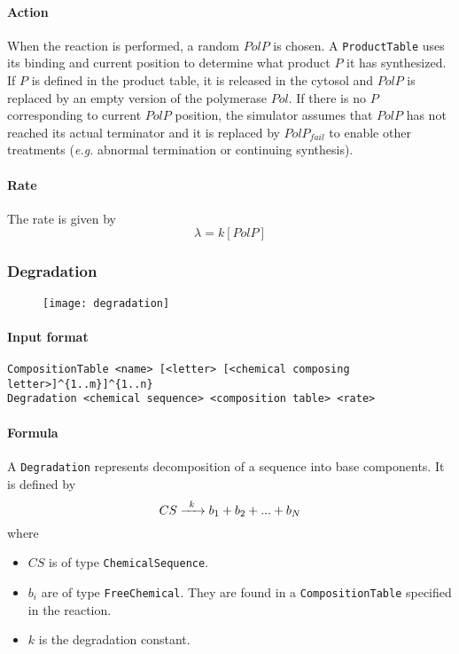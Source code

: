 \paragraph{Action} When the reaction is performed, a random $PolP$ is chosen. A \texttt{ProductTable} uses its binding and current position to determine what product $P$ it has synthesized. If $P$ is defined in the product table, it is released in the cytosol and $PolP$ is replaced by an empty version of the polymerase $Pol$. If there is no $P$ corresponding to current $PolP$ position, the simulator assumes that $PolP$ has not reached its actual terminator and it is replaced by $PolP_{fail}$ to enable other treatments (\textit{e.g.} abnormal termination or continuing synthesis).

\paragraph{Rate} The rate is given by
\[
\lambda = k[PolP]
\]

\subsubsection{Degradation}

\begin{figure}[!ht]
	\centering
	\texttt{[image: degradation]}
\end{figure}

\paragraph{Input format}
\begin{verbatim}
CompositionTable <name> [<letter> [<chemical composing letter>]^{1..m}]^{1..n}
Degradation <chemical sequence> <composition table> <rate>	
\end{verbatim}

\paragraph{Formula} A \texttt{Degradation} represents decomposition of a sequence into base components. It is defined by
\[
	\reactionIrr{CS}{b_1 + b_2 + ... + b_N}{k}{}
\]
where
\begin{itemize}
	\item $CS$ is of type \texttt{ChemicalSequence}.
	\item $b_i$ are of type \texttt{FreeChemical}. They are found in a \texttt{CompositionTable} specified in the reaction.
	\item $k$ is the degradation constant.
\end{itemize}

